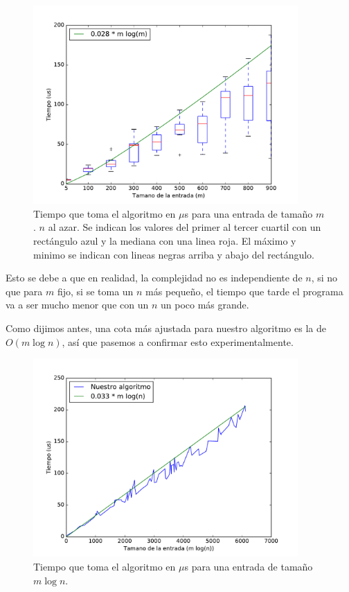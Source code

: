 \begin{figure}[H]
 \centering
	\includegraphics[width=0.9\textwidth]{img/exp/problema2-promedio2.pdf}
  \caption{\footnotesize Tiempo que toma el algoritmo en $\mu$s para una entrada de tamaño $m$. $n$ al azar. Se indican los valores del primer al tercer cuartil con un rectángulo azul y la mediana con una linea roja. El máximo y minimo se indican con lineas negras arriba y abajo del rectángulo.}
	\label{fig:problema2-promedio2}
\end{figure}

Esto se debe a que en realidad, la complejidad no es independiente de $n$, si no que para $m$ fijo, si se toma un $n$ más pequeño, el tiempo que tarde el programa va a ser mucho menor que con un $n$ un poco más grande.

Como dijimos antes, una cota más ajustada para nuestro algoritmo es la de $O(m \log n)$, así que pasemos a confirmar esto experimentalmente.

\begin{figure}[H]
 \centering
	\includegraphics[width=0.9\textwidth]{img/exp/problema2-posta.pdf}
	\caption{\footnotesize Tiempo que toma el algoritmo en $\mu$s para una entrada de tamaño $m \log n$.}
	\label{fig:problema2-posta}
\end{figure}


